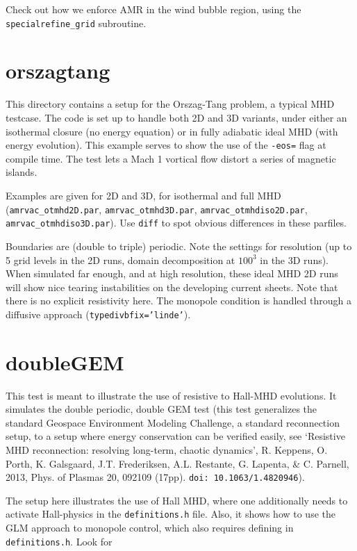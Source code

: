 \documentclass[10pt]{article}
\begin{document}
Check out how we enforce AMR in the wind bubble region, using the {\tt specialrefine\_grid} subroutine.

\section*{orszagtang}

This directory contains a setup for the Orszag-Tang problem, a typical MHD testcase. The code is set up to handle both 2D and 3D variants, under either an isothermal closure (no energy equation) or in fully adiabatic ideal MHD (with energy evolution). This example serves to show the use of the {\tt -eos=} flag at compile time. The test lets a Mach 1 vortical flow distort a series of magnetic islands. 

Examples are given for 2D and 3D, for isothermal and full MHD ({\tt amrvac\_otmhd2D.par}, {\tt amrvac\_otmhd3D.par}, {\tt amrvac\_otmhdiso2D.par}, {\tt amrvac\_otmhdiso3D.par}). Use {\tt diff} to spot obvious differences in these parfiles.

Boundaries are (double to triple) periodic. Note the settings for resolution (up to 5 grid levels in the 2D runs, domain decomposition at $100^3$ in the 3D runs). When simulated far enough, and at high resolution, these ideal MHD 2D runs will show nice tearing instabilities on the developing current sheets. Note that there is no explicit resistivity here. The monopole condition is handled through a diffusive approach ({\tt typedivbfix='linde'}).


\section*{doubleGEM}

This test is meant to illustrate the use of resistive to Hall-MHD evolutions. It simulates the double periodic, double GEM test (this test generalizes the standard Geospace Environment Modeling Challenge, a standard reconnection setup, to a setup where energy conservation can be verified easily, see `Resistive MHD reconnection: resolving long-term, chaotic dynamics', R. Keppens, O. Porth, K. Galsgaard, J.T. Frederiksen, A.L. Restante, G. Lapenta, \& C. Parnell, 2013, Phys. of Plasmas 20, 092109 (17pp). {\tt doi: 10.1063/1.4820946}).

The setup here illustrates the use of Hall MHD, where one additionally needs to activate Hall-physics in the {\tt definitions.h} file. Also, it shows how to use the GLM approach to monopole control, which also requires defining in {\tt definitions.h}. Look for
\end{document}
